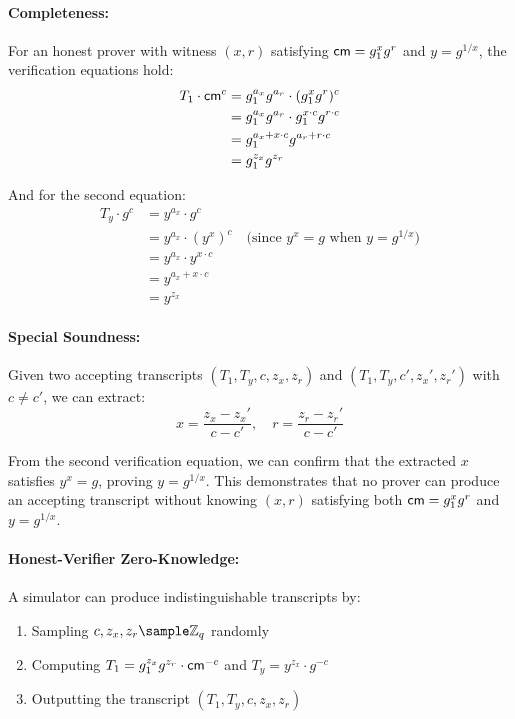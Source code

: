\paragraph{Completeness:} For an honest prover with witness $(x, r)$ satisfying $\mathsf{cm} = g_1^x g^r$ and $y = g^{1/x}$, the verification equations hold:
\begin{align*}
T_1 \cdot \mathsf{cm}^c &= g_1^{a_x} g^{a_r} \cdot (g_1^x g^r)^c \\
&= g_1^{a_x} g^{a_r} \cdot g_1^{x \cdot c} g^{r \cdot c} \\
&= g_1^{a_x + x \cdot c} g^{a_r + r \cdot c} \\
&= g_1^{z_x} g^{z_r}
\end{align*}

And for the second equation:
\begin{align*}
T_y \cdot g^c &= y^{a_x} \cdot g^c \\
&= y^{a_x} \cdot (y^x)^c \quad \text{(since $y^x = g$ when $y = g^{1/x}$)} \\
&= y^{a_x} \cdot y^{x \cdot c} \\
&= y^{a_x + x \cdot c} \\
&= y^{z_x}
\end{align*}

\paragraph{Special Soundness:} Given two accepting transcripts $(T_1, T_y, c, z_x, z_r)$ and $(T_1, T_y, c', z_x', z_r')$ with $c \neq c'$, we can extract:
\[
x = \frac{z_x - z_x'}{c - c'}, \quad r = \frac{z_r - z_r'}{c - c'}
\]

From the second verification equation, we can confirm that the extracted $x$ satisfies $y^x = g$, proving $y = g^{1/x}$. This demonstrates that no prover can produce an accepting transcript without knowing $(x, r)$ satisfying both $\mathsf{cm} = g_1^x g^r$ and $y = g^{1/x}$.

\paragraph{Honest-Verifier Zero-Knowledge:} A simulator can produce indistinguishable transcripts by:
\begin{enumerate}
    \item Sampling $c, z_x, z_r \sample \mathbb{Z}_q$ randomly
    \item Computing $T_1 = g_1^{z_x} g^{z_r} \cdot \mathsf{cm}^{-c}$ and $T_y = y^{z_x} \cdot g^{-c}$
    \item Outputting the transcript $(T_1, T_y, c, z_x, z_r)$
\end{enumerate}

